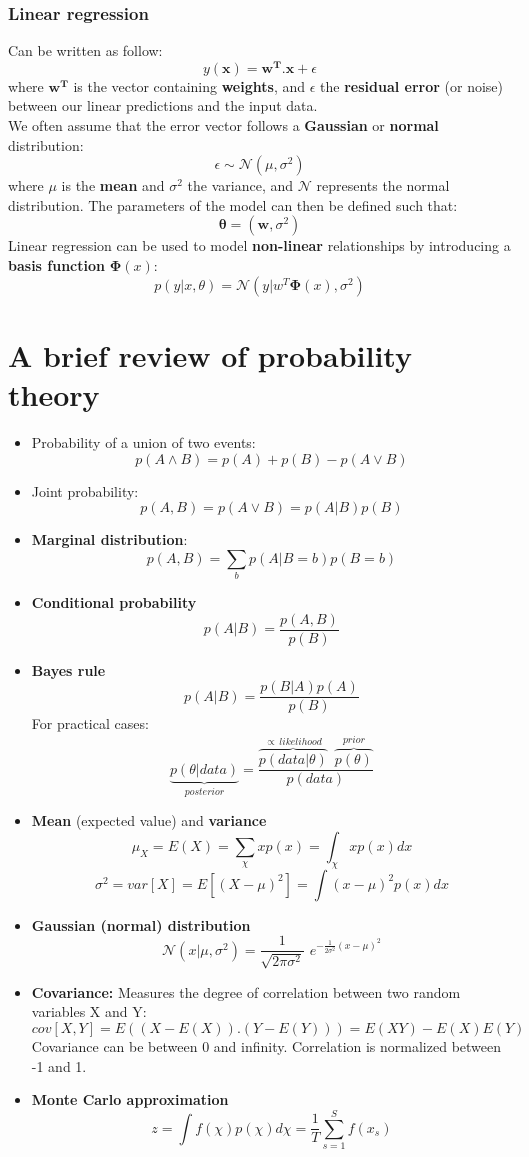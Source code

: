 \documentclass[a4paper,11pt]{article}
\begin{document}
\subsubsection{Linear regression}
Can be written as follow:
\[
y(\mathbf{x}) = \mathbf{w^T}.\mathbf{x} + \epsilon
\]
where $\mathbf{w^T}$ is the vector containing \textbf{weights}, and $\epsilon$ the \textbf{residual error} (or noise) between our linear predictions and the input data.\\
We often assume that the error vector follows a \textbf{Gaussian} or \textbf{normal} distribution:
\[
\epsilon \sim \mathcal{N}(\mu, \sigma^2)
\]
where $\mu$ is the \textbf{mean} and $\sigma^2$ the variance, and $\mathcal{N}$ represents the normal distribution. The parameters of the model can then be defined such that:
\[
\mathbf{\theta}=(\mathbf{w},\sigma^2)
\]
Linear regression can be used to model \textbf{non-linear} relationships by introducing a \textbf{basis function} $\mathbf{\Phi}(x)$:
\[
p(y | x,\theta) = \mathcal{N}(y| w^T\mathbf{\Phi}(x),\sigma^2) 
\]
\pagebreak
\section{A brief review of probability theory}
\begin{itemize}
\item Probability of a union of two events:
\[
p(A \wedge B) = p(A) + p(B) - p(A \vee B)
\]
\item Joint probability:
\[
p(A,B) = p(A \vee B) = p(A | B)p(B)
\]
\item \textbf{Marginal distribution}:
\[
p(A,B) = \sum_{b} p(A | B=b)p(B=b)
\]
\item \textbf{Conditional probability}
\[
p(A|B) = \frac{p(A,B)}{p(B)}
\]
\item \textbf{Bayes rule}
\[
p(A|B) = \frac{p(B|A)p(A)}{p(B)}
\]
For practical cases:
\[
\underbrace{p(\theta|data)}_{posterior} = \frac{\overbrace{p(data|\theta)}^{\propto\,likelihood}\,\,\,\overbrace{p(\theta)}^{prior}}{p(data)}
\]
\item \textbf{Mean} (expected value) and \textbf{variance}
\[
\mu_X = E(X)=\sum_{\chi} x p(x) = \int_{\chi} x p(x)dx
\]
\[
\sigma^2= var[X] = E[(X-\mu)^2]=\int (x-\mu)^2 p(x)dx
\]
\item \textbf{Gaussian (normal) distribution}
\[
\mathcal{N}(x|\mu, \sigma^2) = \frac{1}{\sqrt{2\pi\sigma^2}}\,\, e^{-\frac{1}{2\sigma^2} (x-\mu)^2}
\]
\item \textbf{Covariance:} Measures the degree of correlation between two random variables X and Y:
\[
cov[X,Y] = E((X-E(X)).(Y-E(Y))) = E(XY)-E(X)E(Y)
\]
Covariance can be between 0 and infinity. Correlation is normalized between -1 and 1.
\item \textbf{Monte Carlo approximation}
\[
z = \int f(\chi)p(\chi)d\chi = \frac{1}{T} \sum_{s=1}^{S} f(x_s)	
\]
\end{itemize}
\end{document}
